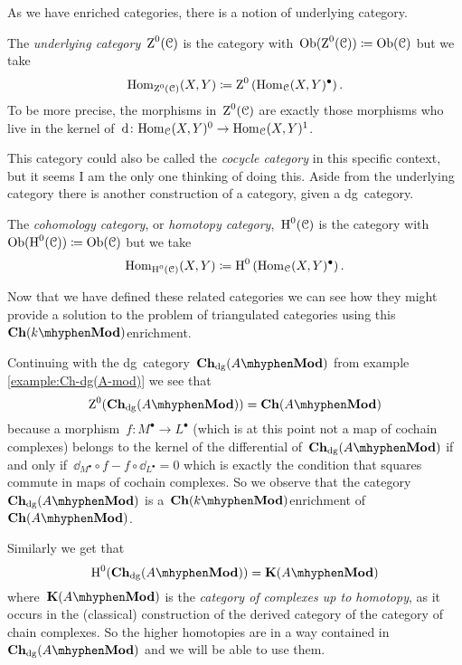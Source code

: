 As we have enriched categories, there is a notion of underlying category.
\begin{definition}
  \label{definition:underlying-category}
  The \emph{underlying category}~$\operatorname{Z}^0(\mathcal{C})$ is the category with~$\operatorname{Ob}(\operatorname{Z}^0(\mathcal{C}))\coloneqq\operatorname{Ob}(\mathcal{C})$ but we take
  \begin{equation}
    \mathrm{Hom}_{\operatorname{Z}^0(\mathcal{C})}(X,Y)\coloneqq\operatorname{Z}^0\left( \mathrm{Hom}_{\mathcal{C}}(X,Y)^\bullet \right).
  \end{equation}
  To be more precise, the morphisms in~$\operatorname{Z}^0(\mathcal{C})$ are exactly those morphisms who live in the kernel of~$\mathrm{d}\colon\mathrm{Hom}_{\mathcal{C}}(X,Y)^0\to\mathrm{Hom}_{\mathcal{C}}(X,Y)^1$.
\end{definition}
This category could also be called the \emph{cocycle category} in this specific context, but it seems I am the only one thinking of doing this. Aside from the underlying category there is another construction of a category, given a dg~category.
\begin{definition}
  \label{definition:homotopy-category}
  The \emph{cohomology category}, or \emph{homotopy category},~$\operatorname{H}^0(\mathcal{C})$ is the category with~$\operatorname{Ob}(\operatorname{H}^0(\mathcal{C}))\coloneqq\operatorname{Ob}(\mathcal{C})$ but we take
  \begin{equation}
    \mathrm{Hom}_{\operatorname{H}^0(\mathcal{C})}(X,Y)\coloneqq\operatorname{H}^0\left( \mathrm{Hom}_{\mathcal{C}}(X,Y)^\bullet \right).
  \end{equation}
\end{definition}

Now that we have defined these related categories we can see how they might provide a solution to the problem of triangulated categories using this~$\Ch(k\mhyphen\Mod)$\dash enrichment.
\begin{example}
  \label{example:Z0(Ch-dg(A-mod))}
  Continuing with the dg~category~$\Ch_\dg(A\mhyphen\Mod)$ from example \ref{example:Ch-dg(A-mod)} we see that
  \begin{equation}
    \ZZ^0(\Ch_\dg(A\mhyphen\Mod))=\Ch(A\mhyphen\Mod)
  \end{equation}
  because a morphism~$f\colon M^\bullet\to L^\bullet$ (which is at this point not a map of cochain complexes) belongs to the kernel of the differential of~$\Ch_\dg(A\mhyphen\Mod)$ if and only if~$\dd_{M^\bullet}\circ f-f\circ\dd_{L^\bullet}=0$ which is exactly the condition that squares commute in maps of cochain complexes. So we observe that the category~$\Ch_\dg(A\mhyphen\Mod)$ is a~$\Ch(k\mhyphen\Mod)$\dash enrichment of~$\Ch(A\mhyphen\Mod)$.
  
  Similarly we get that
  \begin{equation}
    \HH^0(\Ch_\dg(A\mhyphen\Mod))=\KKK(A\mhyphen\Mod) 
  \end{equation}
  where~$\KKK(A\mhyphen\Mod)$ is the \emph{category of complexes up to homotopy}, as it occurs in the (classical) construction of the derived category of the category of chain complexes. So the higher homotopies are in a way contained in~$\Ch_\dg(A\mhyphen\Mod)$ and we will be able to use them.
\end{example}


